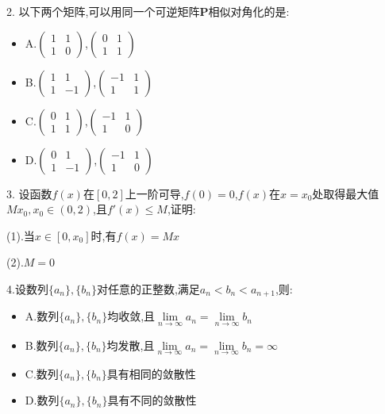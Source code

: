 2. 以下两个矩阵,可以用同一个可逆矩阵$\mathbf{P}$相似对角化的是:
\begin{itemize}
	\item A.$\begin{pmatrix}
		1&1\\1&0
	\end{pmatrix}$,$\begin{pmatrix}
	0&1\\1&1
	\end{pmatrix}$
	\item B.$\begin{pmatrix}
		1&1\\1&-1
	\end{pmatrix}$,$\begin{pmatrix}
		-1&1\\1&1
	\end{pmatrix}$
	\item C.$\begin{pmatrix}
		0&1\\1&1
	\end{pmatrix}$,$\begin{pmatrix}
		-1&1\\1&0
	\end{pmatrix}$
	\item D.$\begin{pmatrix}
		0&1\\1&-1
	\end{pmatrix}$,$\begin{pmatrix}
		-1&1\\1&0
	\end{pmatrix}$
\end{itemize}
\begin{solution}
	
\end{solution}

3. 设函数$f(x)$在$[0,2]$上一阶可导,$f(0)=0$,$f(x)$在$x=x_{0}$处取得最大值$Mx_{0},x_{0}\in(0,2)$,且$f'(x)\leq M$,证明:

(1).当$x\in[0,x_{0}]$时,有$f(x)=Mx$

(2).$M=0$
\begin{solution}
	
\end{solution}

4.设数列$\{a_{n}\},\{b_{n}\}$对任意的正整数,满足$a_{n}<b_{n}<a_{n+1}$,则:
\begin{itemize}
	\item A.数列$\{a_{n}\},\{b_{n}\}$均收敛,且$\lim\limits_{n\rightarrow  \infty}a_{n}=\lim\limits_{n\rightarrow \infty}b_{n}$
	\item B.数列$\{a_{n}\},\{b_{n}\}$均发散,且$\lim\limits_{n\rightarrow  \infty}a_{n}=\lim\limits_{n\rightarrow \infty}b_{n}=\infty$
	\item C.数列$\{a_{n}\},\{b_{n}\}$具有相同的敛散性
	\item D.数列$\{a_{n}\},\{b_{n}\}$具有不同的敛散性
\end{itemize}
\begin{solution}
	
\end{solution}

